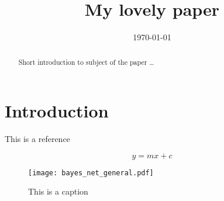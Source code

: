 \documentclass[12pt, a4paper]{article}
\title{My lovely paper}
\date{\today}
\begin{document}
\maketitle

\begin{abstract}
Short introduction to subject of the paper \ldots
\end{abstract}

\section{Introduction}
This is a reference \citep{Vincent:2015dh}

\lipsum[1-2] %

\begin{equation}
\label{eq1}
  y = mx+c
\end{equation}

\lipsum[2] %

\begin{figure}[t!] 
	\centering
	\texttt{[image: bayes\_net\_general.pdf]} 
	\caption{This is a caption}
	\label{fig:first_figure}
\end{figure}

\lipsum[3-5] %

\clearpage


\end{document}
